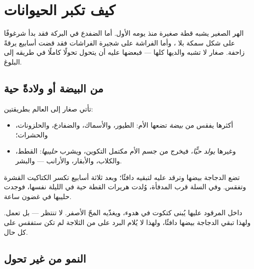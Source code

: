 \chapter{كيف تكبر الحيوانات}\label{ch:g2:animals-grow-up}

الهر الصغير يشبه قطة صغيرة منذ يومه الأول. أما الضفدع في البركة
فقد بدأ شرغوفًا على شكل سمكة بلا ، وأما الفراشة على شجيرة
الفراشات فقد قضت أسابيع يرقةً زاحفة. صغار  لا تشبه
والديها كلها --- فبعضها عليه أن يتحول تحولًا كاملًا في طريقه إلى
البلوغ.

\section{من البيضة أو ولادةً حية}

\begin{definition}\label{def:g2:animals-grow-up:born}
تأتي صغار  إلى العالم بطريقتين:
\begin{itemize}
  \item أكثرها يفقس من \emph{بيضة} تضعها الأم: الطيور،
        والأسماك، والضفادع، والحلزونات، والحشرات؛
  \item وغيرها \emph{يولد حيًّا}، فيخرج من جسم
        الأم مكتمل التكوين، ويشرب \emph{حليبها}:
        القطط، والكلاب، والأبقار، والأرانب --- والبشر.
\end{itemize}
\end{definition}

\begin{example}\label{ex:g2:animals-grow-up:henhouse}
تضع الدجاجة بيضها وترقد عليه لتبقيه دافئًا؛ وبعد ثلاثة أسابيع
تكسر الكتاكيت القشرة وتفقس. وفي السلة قرب المدفأة، وُلدت هريرات
القطة حية في الليلة نفسها، فوجدت حليبها في غضون ساعة.
\end{example}

\begin{remark}\label{rem:g2:animals-grow-up:egg}
داخل  المرقود عليها يُبنى كتكوت في هدوء، ويغذّيه المحّ
الأصفر.  لا تنتظر --- بل تعمل. ولهذا تبقي الدجاجة بيضها
دافئًا، ولهذا لا يُلام البرد على  من الثلاجة لم تكن ستفقس على
كل حال.
\end{remark}

\section{النمو من غير تحول}

